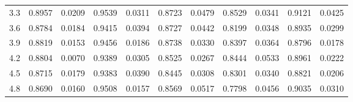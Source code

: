 \begin{tabular}{rrrrrrrrrrr}
       3.3 &   0.8957 & 0.0209 &               0.9539 & 0.0311 &                   0.8723 & 0.0479 &               0.8529 & 0.0341 &                       0.9121 & 0.0425 \\
       3.6 &   0.8784 & 0.0184 &               0.9415 & 0.0394 &                   0.8727 & 0.0442 &               0.8199 & 0.0348 &                       0.8935 & 0.0299 \\
       3.9 &   0.8819 & 0.0153 &               0.9456 & 0.0186 &                   0.8738 & 0.0330 &               0.8397 & 0.0364 &                       0.8796 & 0.0178 \\
       4.2 &   0.8804 & 0.0070 &               0.9389 & 0.0305 &                   0.8525 & 0.0267 &               0.8444 & 0.0533 &                       0.8961 & 0.0222 \\
       4.5 &   0.8715 & 0.0179 &               0.9383 & 0.0390 &                   0.8445 & 0.0308 &               0.8301 & 0.0340 &                       0.8821 & 0.0206 \\
       4.8 &   0.8690 & 0.0160 &               0.9508 & 0.0157 &                   0.8569 & 0.0517 &               0.7798 & 0.0456 &                       0.9035 & 0.0310 \\
\bottomrule
\end{tabular}


